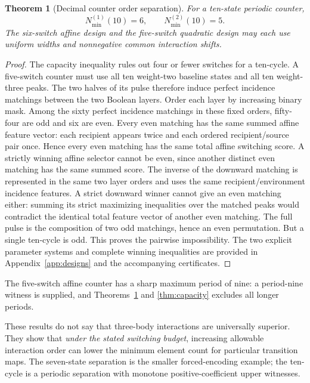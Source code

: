 \documentclass[12pt,letterpaper]{article}
\newtheorem{theorem}{Theorem}[section]
\theoremstyle{definition}\newtheorem{definition}[theorem]{Definition}
\theoremstyle{remark}\newtheorem{remark}[theorem]{Remark}
\newcommand{\Nmin}{N_{\min}}
\begin{document}
\begin{theorem}[Decimal counter order separation]\label{thm:decimal}
For a ten-state periodic counter,
\begin{equation}\label{eq:decimal}
\boxed{\Nmin^{(1)}(10)=6,\qquad \Nmin^{(2)}(10)=5.}
\end{equation}
The six-switch affine design and the five-switch quadratic design may each use uniform widths and nonnegative common interaction shifts.
\end{theorem}
\begin{proof}
The capacity inequality rules out four or fewer switches for a ten-cycle. A five-switch counter must use all ten weight-two baseline states and all ten weight-three peaks. The two halves of its pulse therefore induce perfect incidence matchings between the two Boolean layers. Order each layer by increasing binary mask. Among the sixty perfect incidence matchings in these fixed orders, fifty-four are odd and six are even. Every even matching has the same summed affine feature vector: each recipient appears twice and each ordered recipient/source pair once. Hence every even matching has the same total affine switching score. A strictly winning affine selector cannot be even, since another distinct even matching has the same summed score. The inverse of the downward matching is represented in the same two layer orders and uses the same recipient/environment incidence features. A strict downward winner cannot give an even matching either: summing its strict maximizing inequalities over the matched peaks would contradict the identical total feature vector of another even matching. The full pulse is the composition of two odd matchings, hence an even permutation. But a single ten-cycle is odd. This proves the pairwise impossibility. The two explicit parameter systems and complete winning inequalities are provided in Appendix~\ref{app:designs} and the accompanying certificates.
\end{proof}

The five-switch affine counter has a sharp maximum period of nine: a period-nine witness is supplied, and Theorems~\ref{thm:decimal} and \ref{thm:capacity} excludes all longer periods.

These results do not say that three-body interactions are universally superior. They show that \emph{under the stated switching budget}, increasing allowable interaction order can lower the minimum element count for particular transition maps. The seven-state separation is the smaller forced-encoding example; the ten-cycle is a periodic separation with monotone positive-coefficient upper witnesses.
\end{document}
